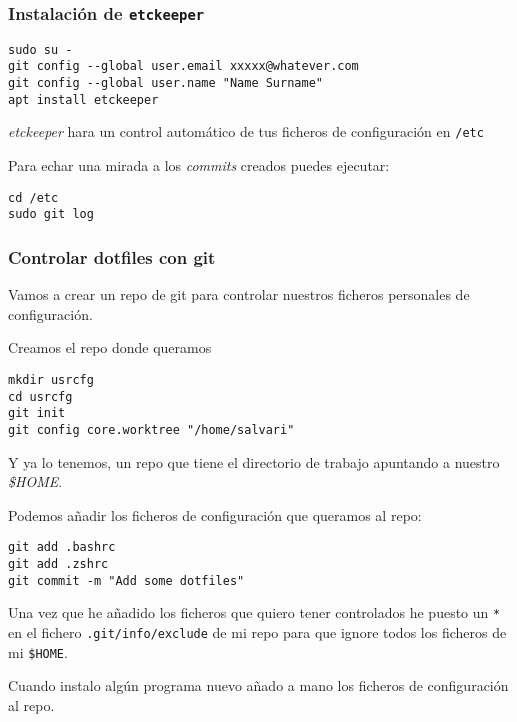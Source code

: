 \documentclass[
  12pt,
  spanish,
]{article}
\begin{document}
\hypertarget{instalaciuxf3n-de-etckeeper}{%
\subsubsection{\texorpdfstring{Instalación de
\texttt{etckeeper}}{Instalación de etckeeper}}\label{instalaciuxf3n-de-etckeeper}}

\begin{verbatim}
sudo su -
git config --global user.email xxxxx@whatever.com
git config --global user.name "Name Surname"
apt install etckeeper
\end{verbatim}

\emph{etckeeper} hara un control automático de tus ficheros de
configuración en \texttt{/etc}

Para echar una mirada a los \emph{commits} creados puedes ejecutar:

\begin{verbatim}
cd /etc
sudo git log
\end{verbatim}

\hypertarget{controlar-dotfiles-con-git}{%
\subsubsection{Controlar dotfiles con
git}\label{controlar-dotfiles-con-git}}

Vamos a crear un repo de git para controlar nuestros ficheros personales
de configuración.

Creamos el repo donde queramos

\begin{verbatim}
mkdir usrcfg
cd usrcfg
git init
git config core.worktree "/home/salvari"
\end{verbatim}

Y ya lo tenemos, un repo que tiene el directorio de trabajo apuntando a
nuestro \emph{\$HOME}.

Podemos añadir los ficheros de configuración que queramos al repo:

\begin{verbatim}
git add .bashrc
git add .zshrc
git commit -m "Add some dotfiles"
\end{verbatim}

Una vez que he añadido los ficheros que quiero tener controlados he
puesto un \texttt{*} en el fichero \texttt{.git/info/exclude} de mi repo
para que ignore todos los ficheros de mi \texttt{\$HOME}.

Cuando instalo algún programa nuevo añado a mano los ficheros de
configuración al repo.
\end{document}

